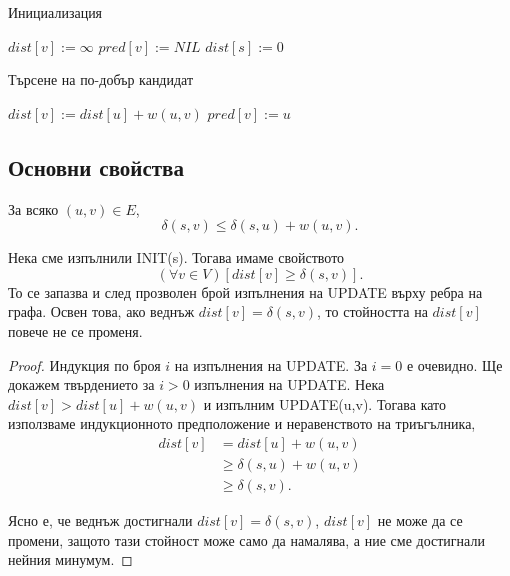 \begin{algorithm}
  \caption{Инициализация}
  \label{alg:init}
  \begin{algorithmic}[1]
    \State $dist[v] := \infty$
    \State $pred[v] := NIL$
    \EndFor
    \State $dist[s] := 0$
    \EndProcedure
  \end{algorithmic}
\end{algorithm}

\begin{algorithm}
  \caption{Търсене на по-добър кандидат}
  \label{alg:update}
  \begin{algorithmic}[1]
    \State $dist[v] := dist[u] + w(u,v)$
    \State $pred[v] := u$
    \EndIf
    \EndProcedure
  \end{algorithmic}
\end{algorithm}

\subsection{Основни свойства}
  
\begin{prop}
  \label{prop:triangle}
  За всяко $(u,v) \in E$,
  \[\delta(s,v) \leq \delta(s,u) + w(u,v).\]
\end{prop}

\begin{prop}
  \label{prop:upper-bound}
  Нека сме изпълнили INIT(s).
  Тогава имаме свойството \[(\forall v\in V)[dist[v] \geq \delta(s,v)].\]
  То се запазва и след прозволен брой изпълнения на UPDATE върху ребра на графа.
  Освен това, ако веднъж $dist[v] = \delta(s,v)$, то стойността на $dist[v]$
  повече не се променя.
\end{prop}
\begin{proof}
  Индукция по броя $i$ на изпълнения на UPDATE.
  За $i = 0$ е очевидно.
  Ще докажем твърдението за $i > 0$ изпълнения на UPDATE.
  Нека $dist[v] > dist[u] + w(u,v)$ и изпълним UPDATE(u,v).
  Тогава като използваме индукционното предположение и неравенството на триъгълника,
  \begin{align*}
    dist[v] & = dist[u] + w(u,v)\\
    & \geq \delta(s,u) + w(u,v)\\
    & \geq  \delta(s,v).
  \end{align*}

  Ясно е, че веднъж достигнали $dist[v] = \delta(s,v)$, $dist[v]$
  не може да се промени, защото тази стойност може само да намалява, а ние
  сме достигнали нейния минумум.
\end{proof}

